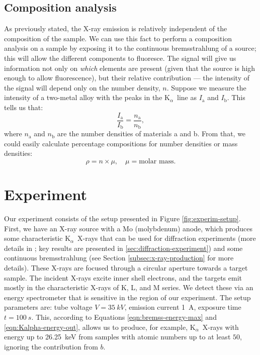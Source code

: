 \documentclass[11pt,a4paper,twoside,onecolumn]{article}
\newcommand{\Kalpha}{$\mathrm{K}_\alpha$~}
\begin{document}
\subsection{Composition analysis}\label{subsec:compos-analysis}
As previously stated, the X-ray emission is relatively independent of the composition of the sample. We can use this fact to perform a composition analysis on a sample by exposing it to the continuous bremsstrahlung of a source; this will allow the different components to fluoresce. The signal will give us information not only on \emph{which} elements are present (given that the source is high enough to allow fluorescence), but their relative contribution --- the intensity of the signal will depend only on the number density, $n$. Suppose we measure the intensity of a two-metal alloy with the peaks in the \Kalpha line as $I_\mathrm{a}$ and $I_\mathrm{b}$.
This tells us that:
\begin{equation}
    \frac{I_\mathrm{a}}{I_\mathrm{b}} = \frac{n_\mathrm{a}}{n_\mathrm{b}},
\end{equation}
where $n_\mathrm{a}$ and $n_\mathrm{b}$ are the number densities of materials a and b. From that, we could easily calculate percentage compositions for number densities or mass densities:
\begin{equation}
    \rho = n \times \mu, \quad \mu = \text{molar mass}.
\end{equation}

\section{Experiment}\label{sec:experiment}
Our experiment consists of the setup presented in Figure \ref{fig:experim-setup}. First, we have an X-ray source with a Mo (molybdenum) anode, which produces some characteristic \Kalpha X-rays that can be used for diffraction experiments (more details in \cite{OxfPhys2010}; key results are presented in \ref{sec:diffraction-experiment}) and some continuous bremsstrahlung (see Section \ref{subsec:x-ray-production} for more details). These X-rays are focused through a circular aperture towards a target sample. The incident X-rays excite inner shell electrons, and the targets emit mostly in the characteristic X-rays of K, L, and M series. We detect these via an energy spectrometer that is sensitive in the region of our experiment. The setup parameters are: tube voltage $V = \qty{35}{kV}$, emission current \qty{1}{A}, exposure time $t=\qty{100}{s}$. This, according to Equations \eqref{eqn:bremss-energy-max} and \eqref{eqn:Kalpha-energy-out}, allows us to produce, for example, \Kalpha X-rays with energy up to \qty{26.25}{keV} from samples with atomic numbers up to at least $50$, ignoring the contribution from $b$.
\end{document}
